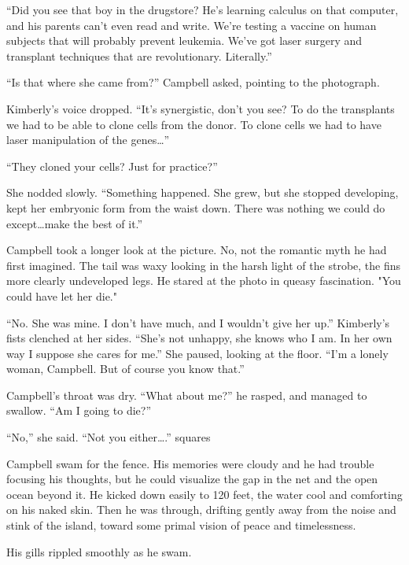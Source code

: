 ``Did you see that boy in the drugstore? He's learning calculus on that computer, and his parents can't even read and write. We're testing a vaccine on human subjects that will probably prevent leukemia. We've got laser surgery and transplant techniques that are revolutionary. Literally.''

``Is that where she came from?'' Campbell asked, pointing to the photograph.

Kimberly's voice dropped. ``It's synergistic, don't you see? To do the transplants we had to be able to clone cells from the donor. To clone cells we had to have laser manipulation of the genes\ldots''

``They cloned your cells? Just for practice?''

She nodded slowly. ``Something happened. She grew, but she stopped developing, kept her embryonic form from the waist down. There was nothing we could do except\ldots make the best of it.''

Campbell took a longer look at the picture. No, not the romantic myth he had first imagined. The tail was waxy looking in the harsh light of the strobe, the fins more clearly undeveloped legs. He stared at the photo in queasy fascination. "You could have let her die."

``No. She was mine. I don't have much, and I wouldn't give her up.'' Kimberly's fists clenched at her sides. ``She's not unhappy, she knows who I am. In her own way I suppose she cares for me.'' She paused, looking at the floor. ``I'm a lonely woman, Campbell. But of course you know that.''

Campbell's throat was dry. ``What about me?'' he rasped, and managed to swallow. ``Am I going to die?''

``No,'' she said. ``Not you either\ldots.''
squares

Campbell swam for the fence. His memories were cloudy and he had trouble focusing his thoughts, but he could visualize the gap in the net and the open ocean beyond it. He kicked down easily to 120 feet, the water cool and comforting on his naked skin. Then he was through, drifting gently away from the noise and stink of the island, toward some primal vision of peace and timelessness.

His gills rippled smoothly as he swam.